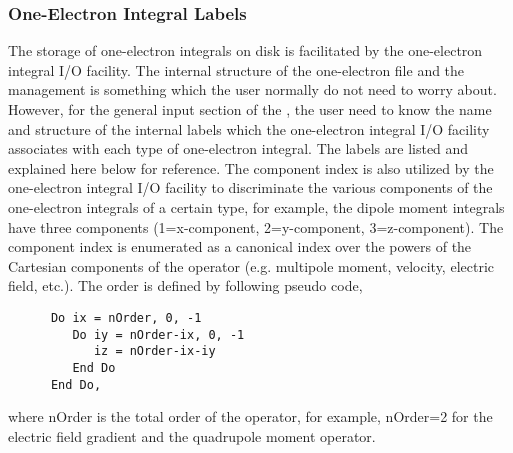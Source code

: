 \subsubsection{One-Electron Integral Labels}
\label{UG:sec:one-electron_integral_labels}

The storage of one-electron integrals on disk is facilitated by the
one-electron integral I/O facility. The internal structure of the
one-electron file and the management is something which the user normally
do not need to worry about. However, for the general input section of the
, the user need to know the name and structure of the internal
labels which the one-electron integral I/O facility associates with each type
of one-electron integral. The labels are listed and explained here below for reference.
The component index is also utilized by the one-electron integral I/O facility to
discriminate the various components of the one-electron integrals of a certain type,
for example, the dipole moment integrals have three components (1=x-component,
2=y-component, 3=z-component). The component index is enumerated as a canonical
index over the powers of the Cartesian components of the operator (e.g. multipole
moment, velocity, electric field, etc.). The order is defined by following pseudo
code,

\begin{verbatim}
      Do ix = nOrder, 0, -1
         Do iy = nOrder-ix, 0, -1
            iz = nOrder-ix-iy
         End Do
      End Do,
\end{verbatim}
where nOrder is the total order of the operator, for example, nOrder=2 for
the electric field gradient and the quadrupole moment operator.
         

